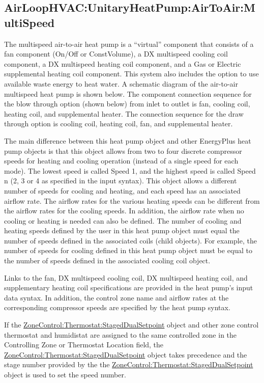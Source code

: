\subsection{AirLoopHVAC:UnitaryHeatPump:AirToAir:MultiSpeed}\label{airloophvacunitaryheatpumpairtoairmultispeed}

The multispeed air-to-air heat pump is a ``virtual'' component that consists of a fan component (On/Off or ConstVolume), a DX multispeed cooling coil component, a DX multispeed heating coil component, and a Gas or Electric supplemental heating coil component. This system also includes the option to use available waste energy to heat water. A schematic diagram of the air-to-air multispeed heat pump is shown below. The component connection sequence for the blow through option (shown below) from inlet to outlet is fan, cooling coil, heating coil, and supplemental heater. The connection sequence for the draw through option is cooling coil, heating coil, fan, and supplemental heater.

The main difference between this heat pump object and other EnergyPlus heat pump objects is that this object allows from two to four discrete compressor speeds for heating and cooling operation (instead of a single speed for each mode). The lowest speed is called Speed 1, and the highest speed is called Speed n (2, 3 or 4 as specified in the input syntax). This object allows a different number of speeds for cooling and heating, and each speed has an associated airflow rate. The airflow rates for the various heating speeds can be different from the airflow rates for the cooling speeds. In addition, the airflow rate when no cooling or heating is needed can also be defined. The number of cooling and heating speeds defined by the user in this heat pump object must equal the number of speeds defined in the associated coils (child objects). For example, the number of speeds for cooling defined in this heat pump object must be equal to the number of speeds defined in the associated cooling coil object.

Links to the fan, DX multispeed cooling coil, DX multispeed heating coil, and supplementary heating coil specifications are provided in the heat pump's input data syntax. In addition, the control zone name and airflow rates at the corresponding compressor speeds are specified by the heat pump syntax.

If the \hyperref[zonecontrolthermostatstageddualsetpoint]{ZoneControl:Thermostat:StagedDualSetpoint} object and other zone control thermostat and humidistat are assigned to the same controlled zone in the Controlling Zone or Thermostat Location field, the \hyperref[zonecontrolthermostatstageddualsetpoint]{ZoneControl:Thermostat:StagedDualSetpoint} object takes precedence and the stage number provided by the the \hyperref[zonecontrolthermostatstageddualsetpoint]{ZoneControl:Thermostat:StagedDualSetpoint} object is used to set the speed number.

